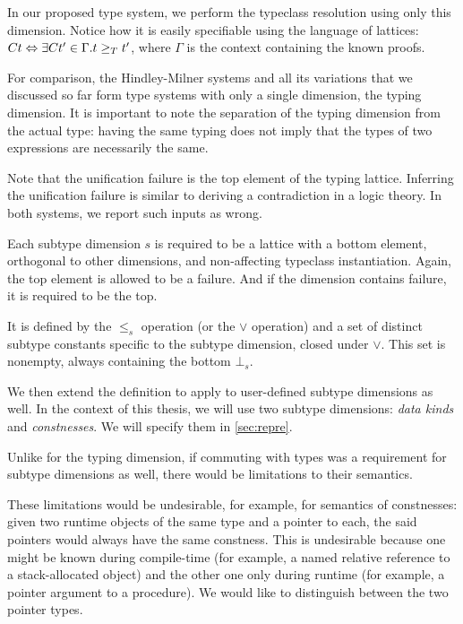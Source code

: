 In our proposed type system, we perform the typeclass resolution using only this dimension. Notice how it is easily specifiable using the language of lattices: $C t \Leftrightarrow \exists C t' \in \Gamma . t \geq_T t'$, where $\Gamma$ is the context containing the known proofs.

For comparison, the Hindley-Milner systems and all its variations that we discussed so far form type systems with only a single dimension, the typing dimension. It is important to note the separation of the typing dimension from the actual type: having the same typing does not imply that the types of two expressions are necessarily the same.

Note that the unification failure is the top element of the typing lattice. Inferring the unification failure is similar to deriving a contradiction in a logic theory. In both systems, we report such inputs as wrong.

\begin{defn}
    \label{def:stDim}
    Each subtype dimension $s$ is required to be a lattice with a bottom element, orthogonal to other dimensions, and non-affecting typeclass instantiation. Again, the top element is allowed to be a failure. And if the dimension contains failure, it is required to be the top.

    It is defined by the $\leq_s$ operation (or the $\lor$ operation) and a set of distinct subtype constants specific to the subtype dimension, closed under $\lor$. This set is nonempty, always containing the bottom $\bot_s$.
\end{defn}

We then extend the definition to apply to user-defined subtype dimensions as well. In the context of this thesis, we will use two subtype dimensions: \emph{data kinds} and \emph{constnesses}. We will specify them in \cref{sec:repre}.

\begin{remark}
    \label{congruence}
    Unlike for the typing dimension, if commuting with types was a requirement for subtype dimensions as well, there would be limitations to their semantics.

    These limitations would be undesirable, for example, for semantics of constnesses: given two runtime objects of the same type and a pointer to each, the said pointers would always have the same constness. This is undesirable because one might be known during compile-time (for example, a named relative reference to a stack-allocated object) and the other one only during runtime (for example, a pointer argument to a procedure). We would like to distinguish between the two pointer types.
\end{remark}


